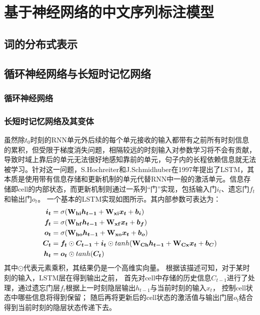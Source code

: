 \chapter{基于神经网络的中文序列标注模型}
\section{词的分布式表示}
\section{循环神经网络与长短时记忆网络}
\subsection{循环神经网络}
\subsection{长短时记忆网络及其变体}
虽然除$t_0$时刻的RNN单元外后续的每个单元接收的输入都带有之前所有时刻信息的累积，但受限于梯度消失问题，相隔较远的时刻输入对参数学习将不会有贡献，导致时域上靠后的单元无法很好地感知靠前的单元，句子内的长程依赖信息就无法被学习。针对这一问题，S.Hochreiter和J.Schmidhuber在1997年提出了LSTM，其本质是使用带有信息存储和更新机制的单元代替RNN中一般的激活单元。信息存储即cell的内部状态，而更新机制则通过一系列“门”实现，包括输入门$i_t$、遗忘门$f_t$和输出门$o_t$。
一个基本的LSTM实现如图所示。其内部参数可表达为：
\begin{align*}
    \boldsymbol{i_t} &= \sigma(\boldsymbol{\mathbf{W_{hi}}}\boldsymbol{h_{t-1}} + \boldsymbol{\mathbf{W_{xi}}}\boldsymbol{x_{t}} + \boldsymbol{b_i})\\
    \boldsymbol{f_t} &= \sigma(\boldsymbol{\mathbf{W_{hf}}}\boldsymbol{h_{t-1}} + \boldsymbol{\mathbf{W_{xf}}}\boldsymbol{x_{t}} + \boldsymbol{b_f})\\
    \boldsymbol{o_t} &= \sigma(\boldsymbol{\mathbf{W_{ho}}}\boldsymbol{h_{t-1}} + \boldsymbol{\mathbf{W_{xo}}}\boldsymbol{x_{t}} + \boldsymbol{b_o})\\
    \boldsymbol{C_t} &= \boldsymbol{f_t}\odot\boldsymbol{C_{t-1}} + \boldsymbol{i_t}\odot tanh(\boldsymbol{\mathbf{W_{Ch}}}\boldsymbol{h_{t-1}} + \boldsymbol{\mathbf{W_{Cx}}}\boldsymbol{x_t} + \boldsymbol{b_{C}})\\
    \boldsymbol{h_t} &= \boldsymbol{o_t} \odot tanh(\boldsymbol{C_t})
\end{align*}
其中$\odot$代表元素乘积，其结果仍是一个高维实向量。
根据该描述可知，对于某时刻的输入，LSTM层在得到输出之前，
首先对cell中存储的历史信息$C_{t-1}$进行了处理，通过遗忘门层$f_t$根据上一时刻隐层输出$h_{t-1}$与当前时刻的输入$x_t$，
控制cell状态中哪些信息将得到保留；
随后再将更新后的cell状态的激活值与输出门层$o_t$结合得到当前时刻的隐层状态传递下去。
